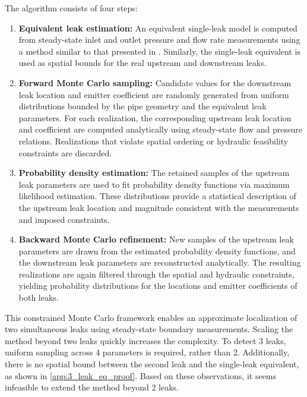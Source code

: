 The algorithm consists of four steps:
\begin{enumerate}
    \item \textbf{Equivalent leak estimation:}  
    An equivalent single-leak model is computed from steady-state inlet and outlet pressure and flow rate measurements using a method similar to that presented in \cite{peralta2023}. Similarly, the single-leak equivalent is used as spatial bounds for the real upstream and downstream leaks.

    \item \textbf{Forward Monte Carlo sampling:}  
    Candidate values for the downstream leak location and emitter coefficient are randomly generated from uniform distributions bounded by the pipe geometry and the equivalent leak parameters. For each realization, the corresponding upstream leak location and coefficient are computed analytically using steady-state flow and pressure relations. Realizations that violate spatial ordering or hydraulic feasibility constraints are discarded.

    \item \textbf{Probability density estimation:}  
    The retained samples of the upstream leak parameters are used to fit probability density functions via maximum likelihood estimation. These distributions provide a statistical description of the upstream leak location and magnitude consistent with the measurements and imposed constraints.

    \item \textbf{Backward Monte Carlo refinement:}  
    New samples of the upstream leak parameters are drawn from the estimated probability density functions, and the downstream leak parameters are reconstructed analytically. The resulting realizations are again filtered through the spatial and hydraulic constraints, yielding probability distributions for the locations and emitter coefficients of both leaks.
\end{enumerate}

This constrained Monte Carlo framework enables an approximate localization of two simultaneous leaks using steady-state boundary measurements. Scaling the method beyond two leaks quickly increases the complexity. To detect 3 leaks, uniform sampling across 4 parameters is required, rather than 2. Additionally, there is no spatial bound between the second leak and the single-leak equivalent, as shown in \autoref{app:3_leak_eq_proof}. Based on these observations, it seems infeasible to extend the method beyond 2 leaks.

